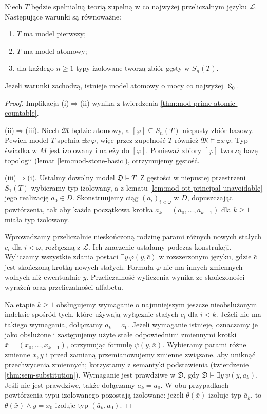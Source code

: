 \begin{twierdzenie}
\label{thm:mod-prime-existence}
Niech $T$ będzie spełnialną teorią zupełną
w co najwyżej przeliczalnym języku $\mathcal L$.
Następujące warunki są równoważne:
\begin{enumerate}[label=(\roman*)]
\item $T$ ma model pierwszy;
\item $T$ ma model atomowy;
\item dla każdego $n\geq 1$ typy izolowane
tworzą zbiór gęsty w $S_n(T)$.
\end{enumerate}
Jeżeli warunki zachodzą, istnieje model atomowy
o mocy co najwyżej $\aleph_0$.
\end{twierdzenie}
\begin{proof}
Implikacja (i)$\Rightarrow$(ii) wynika z twierdzenia
\ref{thm:mod-prime-atomic-countable}.

(ii)$\Rightarrow$(iii).
Niech $\mathfrak M$ będzie atomowy, a
$[\varphi]\subseteq S_n(T)$ niepusty zbiór bazowy.
Pewien model $T$ spełnia $\exists\bar x\,\varphi$,
więc przez zupełność $T$ również
$\mathfrak M\models\exists\bar x\,\varphi$.
Typ świadka w $M$ jest izolowany i należy do
$[\varphi]$. Ponieważ zbiory $[\varphi]$ tworzą
bazę topologii (lemat \ref{lem:mod-stone-basic}),
otrzymujemy gęstość.

(iii)$\Rightarrow$(i).
Ustalmy dowolny model $\mathfrak D\models T$.
Z gęstości w niepustej przestrzeni $S_1(T)$
wybieramy typ izolowany, a z lematu
\ref{lem:mod-ott-principal-unavoidable} jego
realizację $a_0\in D$. Skonstruujemy ciąg
$(a_i)_{i<\omega}$ w $D$, dopuszczając
powtórzenia, tak aby każda początkowa
krotka $\bar a_k=(a_0,\ldots,a_{k-1})$
dla $k\geq 1$ miała typ izolowany.

Wprowadzamy przeliczalnie nieskończoną rodzinę
parami różnych nowych stałych $c_i$ dla $i<\omega$,
rozłączną z $\mathcal L$. Ich znaczenie ustalamy
podczas konstrukcji. Wyliczamy wszystkie
zdania postaci $\exists y\,\varphi(y,\bar c)$
w rozszerzonym języku, gdzie $\bar c$ jest
skończoną krotką nowych stałych.
Formuła $\varphi$ nie ma innych zmiennych wolnych
niż ewentualnie $y$. Przeliczalność wyliczenia
wynika ze skończoności wyrażeń oraz
przeliczalności alfabetu.

Na etapie $k\geq1$ obsługujemy wymaganie o najmniejszym
jeszcze nieobsłużonym indeksie spośród tych,
które używają wyłącznie stałych $c_i$ dla $i<k$.
Jeżeli nie ma takiego wymagania, dołączamy
$a_k=a_0$. Jeżeli wymaganie istnieje, oznaczamy
je jako obsłużone i zastępujemy użyte stałe
odpowiednimi zmiennymi krotki
$\bar x=(x_0,\ldots,x_{k-1})$, otrzymując formułę $\psi(y,\bar x)$.
Wybieramy parami różne zmienne $\bar x,y$ i przed
zamianą przemianowujemy zmienne związane, aby
uniknąć przechwycenia zmiennych; korzystamy z
semantyki podstawienia (twierdzenie
\ref{thm:sem-substitution}).
Wymaganie jest prawdziwe w $\mathfrak D$,
gdy $\mathfrak D\models\exists y\,\psi(y,\bar a_k)$.
Jeśli nie jest prawdziwe, także dołączamy $a_k=a_0$.
W obu przypadkach powtórzenia typu izolowanego
pozostają izolowane: jeżeli $\theta(\bar x)$
izoluje typ $\bar a_k$, to
$\theta(\bar x)\land y=x_0$ izoluje typ
$(\bar a_k,a_0)$.


\end{proof}
